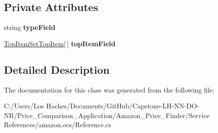 \subsection*{Private Attributes}
\begin{DoxyCompactItemize}
\item 
\hypertarget{class_price___comparison_1_1amazon_1_1ecs_1_1_top_item_set_a911fa4dc4cbf3d42d50f8ac3318a1b27}{string {\bfseries type\-Field}}\label{class_price___comparison_1_1amazon_1_1ecs_1_1_top_item_set_a911fa4dc4cbf3d42d50f8ac3318a1b27}

\item 
\hypertarget{class_price___comparison_1_1amazon_1_1ecs_1_1_top_item_set_a9fb09a4ed048fa6fe1e5a46daedbe124}{\hyperlink{class_price___comparison_1_1amazon_1_1ecs_1_1_top_item_set_top_item}{Top\-Item\-Set\-Top\-Item}\mbox{[}$\,$\mbox{]} {\bfseries top\-Item\-Field}}\label{class_price___comparison_1_1amazon_1_1ecs_1_1_top_item_set_a9fb09a4ed048fa6fe1e5a46daedbe124}

\end{DoxyCompactItemize}


\subsection{Detailed Description}


The documentation for this class was generated from the following file\-:\begin{DoxyCompactItemize}
\item 
C\-:/\-Users/\-Los Haches/\-Documents/\-Git\-Hub/\-Capstone-\/\-L\-H-\/\-N\-N-\/\-D\-O-\/\-N\-R/\-Price\-\_\-\-Comparison\-\_\-\-Application/\-Amazon\-\_\-\-Price\-\_\-\-Finder/\-Service References/amazon.\-ecs/Reference.\-cs\end{DoxyCompactItemize}
